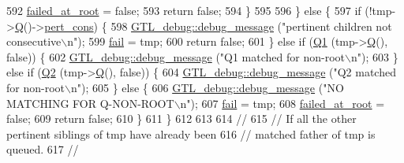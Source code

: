\begin{DoxyCode}
{592             \mbox{\hyperlink{classpq__tree_a5ed4fd9eead5a983afc5e449debe73e2}{failed\_at\_root}} = \textcolor{keyword}{false};
593             \textcolor{keywordflow}{return} \textcolor{keyword}{false};
594             \}
595             
596         \} \textcolor{keywordflow}{else} \{
597             \textcolor{keywordflow}{if} (!tmp->\mbox{\hyperlink{classpq__node_aeeefcfcd19dbe4ca94e190006e8dd484}{Q}}()->\mbox{\hyperlink{classq__node_a4677d97776d1d541a460fd9eac62cc07}{pert\_cons}}) \{
598             \mbox{\hyperlink{class_g_t_l__debug_aca4c2fb24203b5fba5e4ffa9c2fa263f}{GTL\_debug::debug\_message}} (\textcolor{stringliteral}{"pertinent children not consecutive\(\backslash\)n"}); 
599             \mbox{\hyperlink{classpq__tree_a4e0a0e6d74a8ac062acf3a05723a35f2}{fail}} = tmp;
600             \textcolor{keywordflow}{return} \textcolor{keyword}{false};
601             \} \textcolor{keywordflow}{else} \textcolor{keywordflow}{if} (\mbox{\hyperlink{classpq__tree_ab1c7266de209f9ac9f3267b4d8cafc48}{Q1}} (tmp->\mbox{\hyperlink{classpq__node_aeeefcfcd19dbe4ca94e190006e8dd484}{Q}}(), \textcolor{keyword}{false})) \{
602             \mbox{\hyperlink{class_g_t_l__debug_aca4c2fb24203b5fba5e4ffa9c2fa263f}{GTL\_debug::debug\_message}} (\textcolor{stringliteral}{"Q1 matched for non-root\(\backslash\)n"});
603             \} \textcolor{keywordflow}{else} \textcolor{keywordflow}{if} (\mbox{\hyperlink{classpq__tree_a76ca10878264d589c1a11f4f4bf93f83}{Q2}} (tmp->\mbox{\hyperlink{classpq__node_aeeefcfcd19dbe4ca94e190006e8dd484}{Q}}(), \textcolor{keyword}{false})) \{
604             \mbox{\hyperlink{class_g_t_l__debug_aca4c2fb24203b5fba5e4ffa9c2fa263f}{GTL\_debug::debug\_message}} (\textcolor{stringliteral}{"Q2 matched for non-root\(\backslash\)n"});
605             \} \textcolor{keywordflow}{else} \{
606             \mbox{\hyperlink{class_g_t_l__debug_aca4c2fb24203b5fba5e4ffa9c2fa263f}{GTL\_debug::debug\_message}} (\textcolor{stringliteral}{"NO MATCHING FOR Q-NON-ROOT\(\backslash\)n"});
607             \mbox{\hyperlink{classpq__tree_a4e0a0e6d74a8ac062acf3a05723a35f2}{fail}} = tmp;
608             \mbox{\hyperlink{classpq__tree_a5ed4fd9eead5a983afc5e449debe73e2}{failed\_at\_root}} = \textcolor{keyword}{false};
609             \textcolor{keywordflow}{return} \textcolor{keyword}{false};
610             \}
611         \} 
612         
613         
614         \textcolor{comment}{//}
615         \textcolor{comment}{// If all the other pertinent siblings of tmp have already been}
616         \textcolor{comment}{// matched father of tmp is queued.}
617         \textcolor{comment}{//}
}
\end{DoxyCode}
